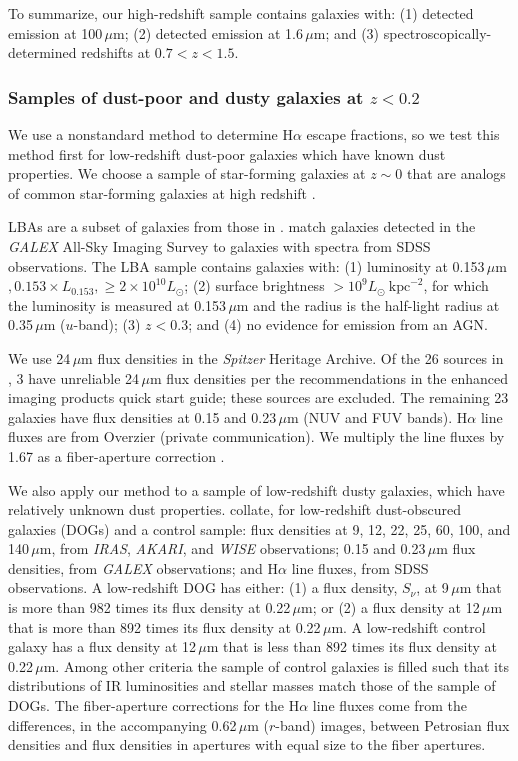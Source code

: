 \documentclass[referee]{aa}
\begin{document}
To summarize, our high-redshift sample contains galaxies with: (1) detected
emission at 100$\,\mu$m; (2) detected emission at 1.6$\,\mu$m; and (3)
spectroscopically-determined redshifts at $0.7 < z < 1.5$.

\subsubsection{Samples of dust-poor and dusty galaxies at $z < 0.2$}

We use a nonstandard method to determine H$\alpha$ escape fractions, so we test this
method first for low-redshift dust-poor galaxies which have known dust
properties.  We choose a sample of star-forming galaxies at $z \sim 0$ that are
analogs of common star-forming galaxies at high redshift
\citep[LBAs;][]{overzier09,overzier11}.

LBAs are a subset of galaxies from those in \citet{heckman05}.
\citet{heckman05} match galaxies detected in the \emph{GALEX} All-Sky Imaging
Survey to galaxies with spectra from SDSS observations.  The LBA sample contains
galaxies with: (1) luminosity at 0.153$\,\mu$m$, 0.153 \times L_{0.153},
\ge 2 \times 10^{10} L_{\odot}$; (2) surface brightness $> 10^{9} L_{\odot}~
\mathrm{kpc}^{-2}$, for which the luminosity is measured at 0.153$\,\mu$m
and the radius is the half-light radius at 0.35$\,\mu$m ($u$-band);
(3) $z < 0.3$; and (4) no evidence for emission from an AGN.

We use 24$\,\mu$m flux densities in the \emph{Spitzer} Heritage Archive.  Of
the 26 sources in \citet{overzier11}, 3 have unreliable 24$\,\mu$m flux
densities per the recommendations in the enhanced imaging products quick start
guide; these sources are excluded.  The remaining 23 galaxies have flux
densities at
0.15 and 0.23$\,\mu$m (NUV and FUV bands).
H$\alpha$ line
fluxes are from Overzier (private communication).  We
multiply the line fluxes by 1.67 as a fiber-aperture correction
\citep{overzier09}.

We also apply our method to a sample of low-redshift dusty galaxies, which have
relatively unknown dust properties.  \citet{hwang13} collate, for low-redshift
dust-obscured galaxies (DOGs) and a control sample: flux densities at
9, 12, 22, 25, 60, 100, and 140$\,\mu$m, from \emph{IRAS}, \emph{AKARI}, and
\emph{WISE} observations; 0.15 and 0.23$\,\mu$m flux densities, from
\emph{GALEX} observations; and H$\alpha$ line fluxes, from SDSS observations.
A low-redshift DOG has either: (1) a flux density, $S_{\nu}$, at 9$\,\mu$m that is more
than 982 times its flux density at 0.22$\,\mu$m; or (2) a flux density at
12$\,\mu$m that is more than 892 times its flux density at 0.22$\,\mu$m.
A low-redshift control galaxy has a flux density at
12$\,\mu$m that is less than 892 times its flux density at 0.22$\,\mu$m.
Among other criteria the sample of control galaxies is filled such that its
distributions of IR luminosities and stellar masses match those of the sample
of DOGs.
The fiber-aperture corrections for the H$\alpha$ line fluxes come from the
differences, in the accompanying 0.62$\,\mu$m ($r$-band) images, between
Petrosian flux
densities and flux densities in apertures with equal size to the fiber
apertures.
\end{document}
